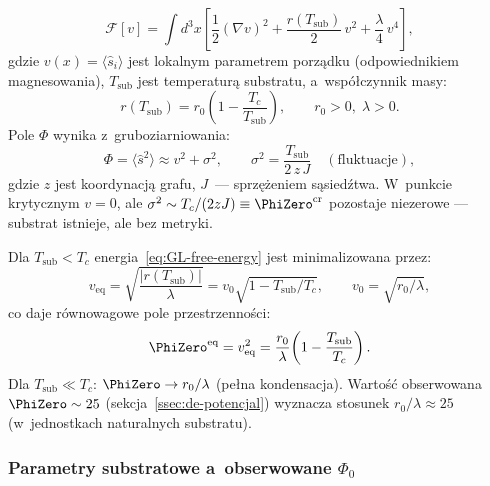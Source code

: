 \begin{equation}\label{eq:GL-free-energy}
    \mathcal{F}[v]
    = \int d^3x \left[
        \frac{1}{2}(\nabla v)^2
        + \frac{r(T_\mathrm{sub})}{2}\,v^2
        + \frac{\lambda}{4}\,v^4
    \right],
\end{equation}
gdzie $v(x) = \langle \hat{s}_i \rangle$ jest lokalnym
parametrem porz\k{a}dku (odpowiednikiem magnesowania),
$T_\mathrm{sub}$ jest temperatur\k{a} substratu,
a~wsp\'o\l{}czynnik masy:
\begin{equation}\label{eq:r-temperature}
    r(T_\mathrm{sub}) = r_0\!\left(1 - \frac{T_c}{T_\mathrm{sub}}\right),
    \qquad r_0 > 0,\;\lambda > 0.
\end{equation}
Pole $\Phi$ wynika z~gruboziarniowania:
\begin{equation}\label{eq:Phi-from-v}
    \Phi = \langle \hat{s}^2 \rangle \approx v^2 + \sigma^2,
    \qquad \sigma^2 = \frac{T_\mathrm{sub}}{2\,z\,J}
    \quad (\text{fluktuacje}),
\end{equation}
gdzie $z$ jest koordynacj\k{a} grafu, $J$~---
sprz\k{e}\.zeniem s\k{a}sied\'ztwa. W~punkcie krytycznym
$v = 0$, ale $\sigma^2 \sim T_c/(2zJ) \equiv \PhiZero^{\mathrm{cr}}$
pozostaje niezerowe --- substrat istnieje, ale bez metryki.

\begin{proposition}\label{prop:veq}
Dla $T_\mathrm{sub} < T_c$ energia~\eqref{eq:GL-free-energy}
jest minimalizowana przez:
\begin{equation}\label{eq:veq}
    v_{\mathrm{eq}} = \sqrt{\frac{|r(T_\mathrm{sub})|}{\lambda}}
    = v_0\sqrt{1 - T_\mathrm{sub}/T_c},
    \qquad v_0 = \sqrt{r_0/\lambda},
\end{equation}
co daje r\'ownowagowe pole przestrzenno\'sci:
\begin{equation}\label{eq:Phi0-eq}
    \PhiZero^{\mathrm{eq}}
    = v_{\mathrm{eq}}^2
    = \frac{r_0}{\lambda}\!\left(1 - \frac{T_\mathrm{sub}}{T_c}\right).
\end{equation}
Dla $T_\mathrm{sub} \ll T_c$: $\PhiZero \to r_0/\lambda$
(pe\l{}na kondensacja). Warto\'s\'c obserwowana $\PhiZero \sim 25$
(sekcja~\ref{ssec:de-potencjal}) wyznacza stosunek
$r_0/\lambda \approx 25$ (w~jednostkach naturalnych substratu).
\end{proposition}

\subsubsection{Parametry substratowe a~obserwowane $\Phi_0$}

